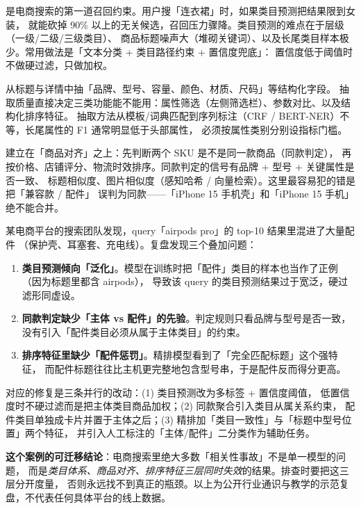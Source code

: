 是电商搜索的第一道召回约束。用户搜「连衣裙」时，如果类目预测把结果限到女装，
就能砍掉 90\% 以上的无关候选，召回压力骤降。类目预测的难点在于层级（一级/二级/三级类目）、
商品标题噪声大（堆砌关键词）、以及长尾类目样本极少。常用做法是「文本分类 + 类目路径约束 + 置信度兜底」：
置信度低于阈值时不做硬过滤，只做加权。

从标题与详情中抽「品牌、型号、容量、颜色、材质、尺码」等结构化字段。
抽取质量直接决定三类功能能不能用：属性筛选（左侧筛选栏）、参数对比、以及结构化排序特征。
抽取方法从模板/词典匹配到序列标注（CRF / BERT-NER）不等，长尾属性的 F1 通常明显低于头部属性，
必须按属性类别分别设指标门槛。

建立在「商品对齐」之上：先判断两个 SKU 是不是同一款商品（同款判定），
再按价格、店铺评分、物流时效排序。同款判定的信号有品牌 + 型号 + 关键属性是否一致、
标题相似度、图片相似度（感知哈希 / 向量检索）。这里最容易犯的错是把「兼容款 / 配件」
误判为同款——「iPhone 15 手机壳」和「iPhone 15 手机」绝不能合并。

\begin{casebox}
某电商平台的搜索团队发现，query「airpods pro」的 top-10 结果里混进了大量配件
（保护壳、耳塞套、充电线）。复盘发现三个叠加问题：
\begin{enumerate}
  \item \textbf{类目预测倾向「泛化」}。模型在训练时把「配件」类目的样本也当作了正例（因为标题里都含 airpods），
        导致该 query 的类目预测结果过于宽泛，硬过滤形同虚设。
  \item \textbf{同款判定缺少「主体 vs 配件」的先验}。判定规则只看品牌与型号是否一致，
        没有引入「配件类目必须从属于主体类目」的约束。
  \item \textbf{排序特征里缺少「配件惩罚」}。精排模型看到了「完全匹配标题」这个强特征，
        而配件标题往往比主机更完整地包含型号串，于是配件反而得分更高。
\end{enumerate}
对应的修复是三条并行的改动：(1) 类目预测改为多标签 + 置信度阈值，
低置信度时不硬过滤而是把主体类目商品加权；(2) 同款聚合引入类目从属关系约束，
配件类目单独成卡片并置于主体之后；(3) 精排加「类目一致性」与「标题中型号位置」两个特征，
并引入人工标注的「主体/配件」二分类作为辅助任务。

\textbf{这个案例的可迁移结论}：电商搜索里绝大多数「相关性事故」不是单一模型的问题，
而是\emph{类目体系、商品对齐、排序特征三层同时失效}的结果。排查时要把这三层分开度量，
否则永远找不到真正的瓶颈。以上为公开行业通识与教学的示范复盘，不代表任何具体平台的线上数据。
\end{casebox}

